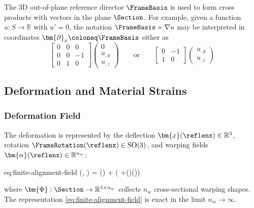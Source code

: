 \begin{remark}
The 3D out-of-plane reference director \(\FrameBasis\) is used to form cross products with vectors in the plane \(\Section\). 
For example, given a function \(u: S \rightarrow \mathbb{R}\) with \(u' = 0\), the notation \(\FrameBasis \times \nabla u\) may be interpreted in coordinates \(\bm{\partial}_x \coloneq \FrameBasis\) either as 
\[
\begin{bmatrix}
0 & 0 & 0 \\
0 & 0 & -1 \\
0 & 1 & 0
\end{bmatrix}
\begin{pmatrix}
0 \\ u_{,y} \\ u_{,z}
\end{pmatrix}
\qquad\text{or}\qquad 
\begin{bmatrix}
0 & -1 \\
1 & 0
\end{bmatrix}
\begin{pmatrix}
u_{,y} \\ u_{,z}
\end{pmatrix}
\]
\end{remark}


\subsection{Deformation and Material Strains}\label{sec:deformation-strains}

\subsubsection{Deformation Field}

The deformation is represented by the deflection \(\bm{x}(\reflenx)\in\mathbb{R}^3\), rotation \(\FrameRotation(\reflenx)\in\mathrm{SO}(3)\), and warping fields \(\bm{\alpha}(\reflenx)\in\mathbb{R}^{n_w}\):
\begin{SaveEquation}{eq:finite-alignment-field}
(, \PlanePosition) 
= () + \FrameRotation \bigl(\PlanePosition 
+\WarpTotalShapes()\bm{\alpha}()\bigr)
\end{SaveEquation}
where \(\bm{\Phi}:\Section\rightarrow\mathbb{R}^{3 \times n_w}\) collects \(n_w\) cross-sectional warping shapes. 
The representation \eqref{eq:finite-alignment-field} is exact in the limit \(n_w\rightarrow\infty\). 

